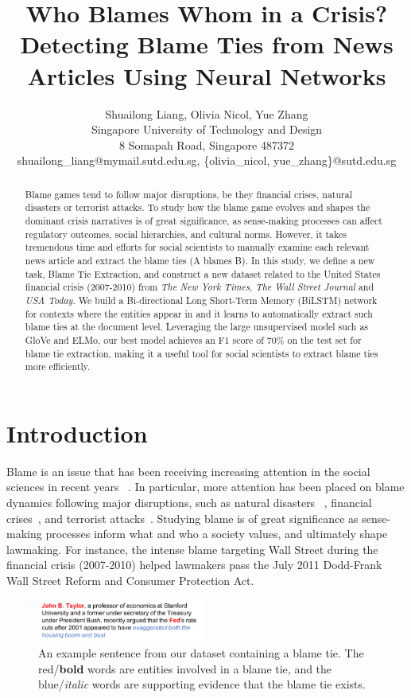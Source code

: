 \documentclass[letterpaper]{article} %
\title{Who Blames Whom in a Crisis? Detecting Blame Ties from News Articles Using Neural Networks}
\author{Shuailong Liang, Olivia Nicol, Yue Zhang\\
		Singapore University of Technology and Design \\
        8 Somapah Road, Singapore 487372\\
		shuailong\_liang@mymail.sutd.edu.sg,
		\{olivia\_nicol, yue\_zhang\}@sutd.edu.sg
}
\begin{document}
\maketitle

\begin{abstract}
Blame games tend to follow major disruptions, be they financial crises, natural disasters or terrorist attacks. To study how the blame game evolves and shapes the dominant crisis narratives is of great significance, as sense-making processes can affect regulatory outcomes, social hierarchies, and cultural norms. However, it takes tremendous time and efforts for social scientists to manually examine each relevant news article and extract the blame ties (A blames B). In this study, we define a new task, Blame Tie Extraction, and construct a new dataset related to the United States financial crisis (2007-2010) from {\it The New York Times}, {\it The Wall Street Journal} and {\it USA Today}. We build a Bi-directional Long Short-Term Memory (BiLSTM) network for contexts where the entities appear in and it learns to automatically extract such blame ties at the document level. Leveraging the large unsupervised model such as GloVe and ELMo, our best model achieves an F1 score of 70\% on the test set for blame tie extraction, making it a useful tool for social scientists to extract blame ties more efficiently.
\end{abstract}

\section{Introduction}

Blame is an issue that has been receiving increasing attention in the social sciences in recent years ~\cite{alicke2000culpable,hobolt2014blaming,hood2010blame,shaver2012attribution}. In particular, more attention has been placed on blame dynamics following major disruptions, such as natural disasters ~\cite{boin2010leadership,malhotra2008attributing}, financial crises~\cite{nicolno,tourish2012metaphors}, and terrorist attacks~\cite{olmeda2008reversal}. Studying blame is of great significance as sense-making processes inform what and who a society values, and ultimately shape lawmaking. For instance, the intense blame targeting Wall Street during the financial crisis (2007-2010) helped lawmakers pass the July 2011 Dodd-Frank Wall Street Reform and Consumer Protection Act.

\begin{figure}[t!]
\centering
\includegraphics[width=0.49\textwidth]{demosm}
\caption{An example sentence from our dataset containing a blame tie. The red/{\bf bold} words are entities involved in a blame tie, and the blue/{\it italic} words are supporting evidence that the blame tie exists.}
\label{figure:introdemo}
\end{figure}
\end{document}
